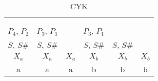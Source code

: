 \documentclass{article}
\begin{document}
\begin{table}[h!]
	\centering
	\caption{CYK}
	\begin{tabular}{|c|c|c|c|c|c|}
		\hline
		 &  &  &  &  & \\
		\hline
		 &  &  &  &  & \\
		\hline
		 &  &  &  &  & \\
		\hline
		$P_4$, $P_2$ & $P_3$, $P_1$ &  & $P_3$, $P_1$ &  & \\
		\hline
		$S$, $S\#$ & $S$, $S\#$ &  & $S$, $S\#$ & $S$, $S\#$ & \\
		\hline
		$X_a$ & $X_a$ & $X_a$ & $X_b$ & $X_b$ & $X_b$\\
		\hline
		\hline
		a & a & a & b & b & b\\
		\hline
	\end{tabular}
\end{table}
\end{document}
